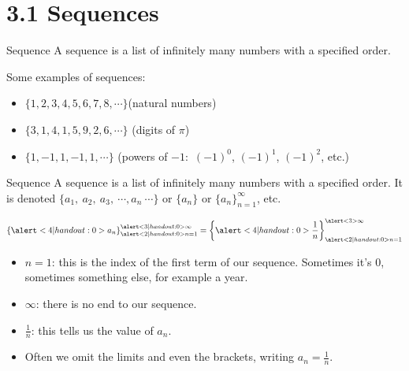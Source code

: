 
\section{3.1 Sequences}
\begin{frame}
\begin{block}{Sequence}
A \alert{sequence} is a list of infinitely many numbers with a specified order. 
\end{block}
Some examples of sequences:
\begin{itemize}
\item $\{1,2,3,4,5,6,7,8,\cdots\}$\qquad (natural numbers)\vfill
\item $\{3,1,4,1,5,9,2,6,\cdots\}$ \qquad (digits of $\pi$)\vfill
\item $\{1,-1,1,-1,1,\cdots\}$ \qquad (powers of $-1:$ $(-1)^0$, $(-1)^1$, $(-1)^2$, etc.)
\end{itemize}
\end{frame}

\begin{frame}
\begin{block}{Sequence}
A \alert{sequence} is a list of infinitely many numbers with a specified order. It is denoted
$\{a_1,\ a_2,\ a_3,\ \cdots, a_n\ \cdots\}$ or $\{a_n\}$ or $\{a_n\}_{n=1}^\infty$, etc.
\end{block}

\[\{\alert<4|handout:0>{a_n}\}_{\alert<2|handout:0>{n=1}}^{\alert<3|handout:0>{\infty}} = \left\{ \alert<4|handout:0>{\frac1n}\right\}_{\alert<2|handout:0>{n=1}}^{\alert<3>{\infty}}\]
\pause\vfill
\begin{itemize}[<+->]
\item \alert<2|handout:0>{$n=1$: this is the index of the first term of our sequence. Sometimes it's 0, sometimes something else, for example a year.}
\item \alert<3|handout:0>{$\infty$: there is no end to our sequence.}
\item \alert<4|handout:0>{$\frac1n$: this tells us the value of $a_n$.}
\item Often we omit the limits and even the brackets, writing \alert<beamer>{$a_n=\frac1n$}.
\end{itemize}
\end{frame}



